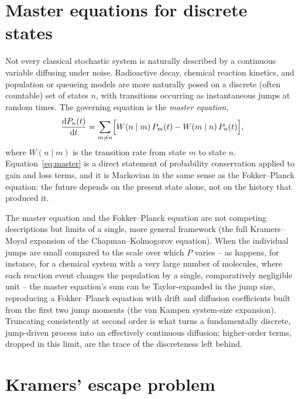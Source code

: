 \section{Master equations for discrete states}
\label{sec:master}

Not every classical stochastic system is naturally described by a
continuous variable diffusing under noise. Radioactive decay, chemical
reaction kinetics, and population or queueing models are more naturally
posed on a discrete (often countable) set of states $n$, with transitions
occurring as instantaneous jumps at random times. The governing equation
is the \emph{master equation},
\begin{equation}
\frac{\mathrm{d} P_n(t)}{\mathrm{d} t} = \sum_{m\neq n}\Bigl[W(n\mid m)\,P_m(t) - W(m\mid n)\,P_n(t)\Bigr],
\label{eq:master}
\end{equation}
where $W(n\mid m)$ is the transition rate from state $m$ to state $n$.
Equation~\eqref{eq:master} is a direct statement of probability
conservation applied to gain and loss terms, and it is Markovian in the
same sense as the Fokker--Planck equation: the future depends on the
present state alone, not on the history that produced it.

The master equation and the Fokker--Planck equation are not competing
descriptions but limits of a single, more general framework (the full
Kramers--Moyal expansion of the Chapman--Kolmogorov equation). When the
individual jumps are small compared to the scale over which $P$ varies --
as happens, for instance, for a chemical system with a very large number
of molecules, where each reaction event changes the population by a
single, comparatively negligible unit -- the master equation's sum can be
Taylor-expanded in the jump size, reproducing a Fokker--Planck equation
with drift and diffusion coefficients built from the first two jump
moments (the van Kampen system-size expansion). Truncating consistently
at second order is what turns a fundamentally discrete, jump-driven
process into an effectively continuous diffusion; higher-order terms,
dropped in this limit, are the trace of the discreteness left behind.

\section{Kramers' escape problem}
\label{sec:kramers}

